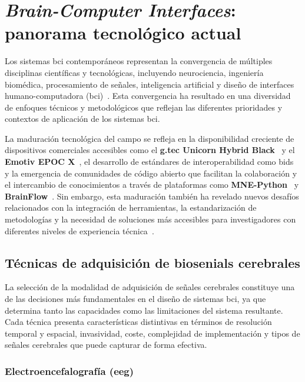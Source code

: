 \section{\textit{Brain-Computer Interfaces}: panorama tecnológico actual}
\label{sec:bci_panorama}

Los sistemas \acrshort{bci} contemporáneos representan la convergencia de múltiples disciplinas científicas y tecnológicas, incluyendo neurociencia, ingeniería biomédica, procesamiento de señales, inteligencia artificial y diseño de interfaces humano-computadora (\acrshort{bci})~\cite{wolpaw2002brain,dornhege2007toward,chavarriaga2017heading}. Esta convergencia ha resultado en una diversidad de enfoques técnicos y metodológicos que reflejan las diferentes prioridades y contextos de aplicación de los sistemas \acrshort{bci}.

La maduración tecnológica del campo se refleja en la disponibilidad creciente de dispositivos comerciales accesibles como el \textbf{g.tec Unicorn Hybrid Black}~\cite{gtec_unicorn} y el \textbf{Emotiv EPOC X}~\cite{emotiv_epoc_x}, el desarrollo de estándares de interoperabilidad como \acrshort{bids}~\cite{bids} y la emergencia de comunidades de código abierto que facilitan la colaboración y el intercambio de conocimientos a través de plataformas como \textbf{MNE-Python}~\cite{gramfort2013meg} y \textbf{BrainFlow}~\cite{brainflow}. Sin embargo, esta maduración también ha revelado nuevos desafíos relacionados con la integración de herramientas, la estandarización de metodologías y la necesidad de soluciones más accesibles para investigadores con diferentes niveles de experiencia técnica~\cite{brunner2013bnci,tangermann2012review}.

\subsection{Técnicas de adquisición de \glspl{biosenial} cerebrales}
\label{subsec:tecnicas_adquisicion}

La selección de la modalidad de adquisición de señales cerebrales constituye una de las decisiones más fundamentales en el diseño de sistemas \acrshort{bci}, ya que determina tanto las capacidades como las limitaciones del sistema resultante. Cada técnica presenta características distintivas en términos de resolución temporal y espacial, invasividad, coste, complejidad de implementación y tipos de señales cerebrales que puede capturar de forma efectiva.

\subsubsection{Electroencefalografía (\acrshort{eeg})}
\label{subsubsec:eeg}

